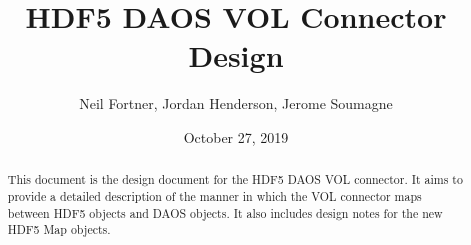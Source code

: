\documentclass[letterpaper,hyper]{THG_Guide}
\title{HDF5 DAOS VOL Connector Design}
\author{Neil Fortner, Jordan Henderson, Jerome Soumagne}
\date{October 27, 2019}
\begin{document}
\maketitle

\begin{abstract}
This document is the design document for the HDF5 DAOS VOL connector. It aims to provide a detailed description of the manner in which the VOL connector maps between HDF5 objects and DAOS objects. It also includes design notes for the new HDF5 Map objects.
\end{abstract}


\makerevisions

\tableofcontents
\newpage




%
%
\end{document}
